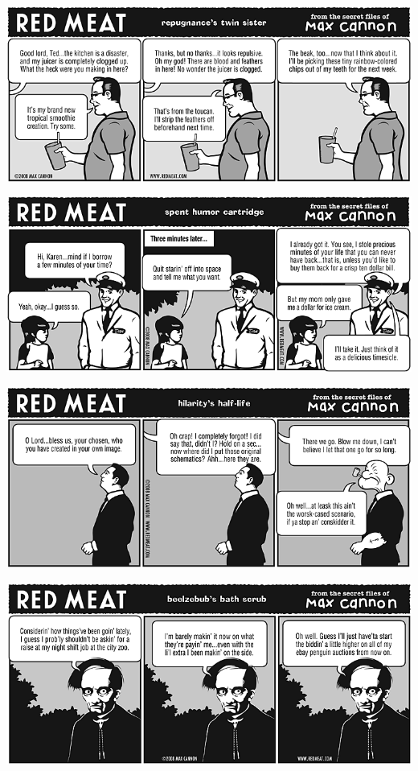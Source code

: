 \documentclass[a4paper,twoside,11pt]{article}
\begin{document}
\includegraphics[width=\textwidth]{redmeat_2008-09-23.png}



\includegraphics[width=\textwidth]{redmeat_2008-09-30.png}



\includegraphics[width=\textwidth]{redmeat_2008-10-07.png}



\includegraphics[width=\textwidth]{redmeat_2008-10-14.png}
\end{document}
